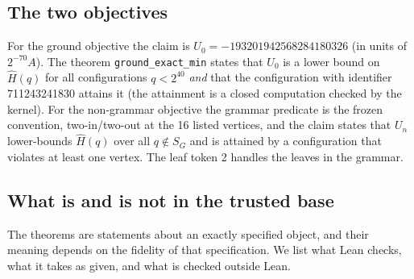 \documentclass[11pt,a4paper]{article}
\theoremstyle{plain}
\theoremstyle{definition}
\theoremstyle{remark}
\newcommand{\lean}[1]{\nolinkurl{#1}}
\begin{document}
\subsection{The two objectives}
For the ground objective the claim is $U_0=-193201942568284180326$ (in units of $2^{-70}A$). The theorem \lean{ground_exact_min} states that $U_0$ is a lower bound on $\hat H(q)$ for all configurations $q<2^{40}$ \emph{and} that the configuration with identifier 711243241830 attains it (the attainment is a closed computation checked by the kernel). For the non-grammar objective the grammar predicate is the frozen convention, two-in/two-out at the 16 listed vertices, and the claim states that $U_n$ lower-bounds $\hat H(q)$ over all $q\notin S_G$ and is attained by a configuration that violates at least one vertex. The leaf token 2 handles the leaves in the grammar.

\subsection{What is and is not in the trusted base}
The theorems are statements about an exactly specified object, and their meaning depends on the fidelity of that specification. We list what Lean checks, what it takes as given, and what is checked outside Lean.
\end{document}
